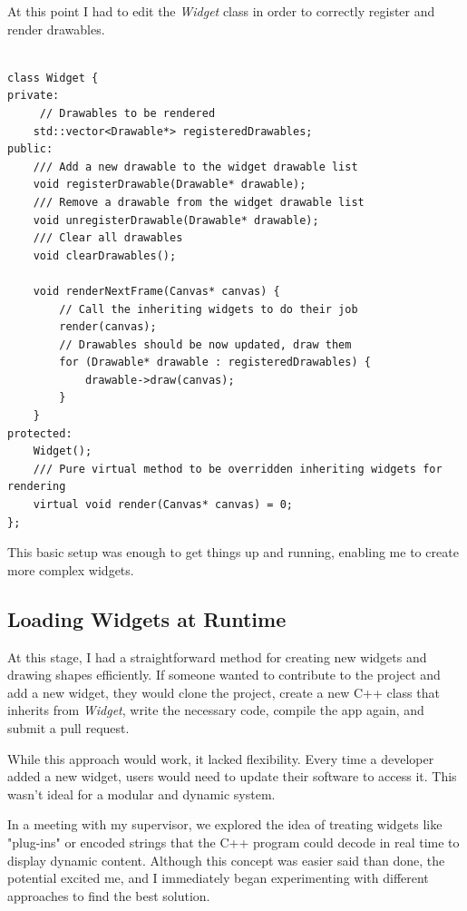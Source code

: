\newpage

At this point I had to edit the \textit{Widget} class in order to correctly register and render drawables.


\begin{verbatim}

class Widget {
private:
     // Drawables to be rendered
    std::vector<Drawable*> registeredDrawables;    
public:
    /// Add a new drawable to the widget drawable list
    void registerDrawable(Drawable* drawable);
    /// Remove a drawable from the widget drawable list
    void unregisterDrawable(Drawable* drawable);
    /// Clear all drawables
    void clearDrawables();

    void renderNextFrame(Canvas* canvas) {
        // Call the inheriting widgets to do their job
        render(canvas);
        // Drawables should be now updated, draw them
        for (Drawable* drawable : registeredDrawables) {
            drawable->draw(canvas);
        }
    }
protected:
    Widget();
    /// Pure virtual method to be overridden inheriting widgets for rendering
    virtual void render(Canvas* canvas) = 0;
};
\end{verbatim}

This basic setup was enough to get things up and running, enabling me to create more complex widgets.

\subsection{Loading Widgets at Runtime} At this stage, I had a straightforward method for creating new widgets and drawing shapes efficiently. If someone wanted to contribute to the project and add a new widget, they would clone the project, create a new C++ class that inherits from \textit{Widget}, write the necessary code, compile the app again, and submit a pull request.

While this approach would work, it lacked flexibility. Every time a developer added a new widget, users would need to update their software to access it. This wasn't ideal for a modular and dynamic system.

In a meeting with my supervisor, we explored the idea of treating widgets like "plug-ins" or encoded strings that the C++ program could decode in real time to display dynamic content. Although this concept was easier said than done, the potential excited me, and I immediately began experimenting with different approaches to find the best solution.

